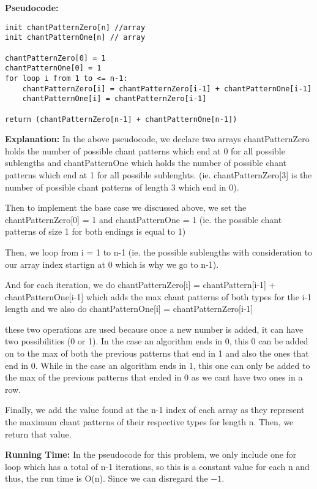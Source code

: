 \documentclass[letterpaper,11pt]{article}
\begin{document}
{\bf Pseudocode:} 
\begin{Verbatim}[commandchars=\\\{\},codes={\catcode`$=3\catcode`_=8}]
init chantPatternZero[n] //array
init chantPatternOne[n] // array

chantPatternZero[0] = 1
chantPatternOne[0] = 1
for loop i from 1 to <= n-1: 
    chantPatternZero[i] = chantPatternZero[i-1] + chantPatternOne[i-1]
    chantPatternOne[i] = chantPatternZero[i-1]

return (chantPatternZero[n-1] + chantPatternOne[n-1])
\end{Verbatim}
{\bf Explanation: } In the above pseudocode, we declare two arrays chantPatternZero holds the number of possible chant patterns which end at 0 for all possible sublengths and chantPatternOne which holds the number of possible chant patterns which end at 1 for all possible sublenghts. (ie. chantPatternZero[3] is the number of possible chant patterns of length 3 which end in 0).

Then to implement the base case we discussed above, we set the 
chantPatternZero[0] = 1 and chantPatternOne = 1 (ie. the possible chant patterns of size 1 for both endings is equal to 1)

Then, we loop from i = 1 to n-1 (ie. the possible sublengths with consideration to our array index startign at 0 which is why we go to n-1). 

And for each iteration, we do 
chantPatternZero[i] = chantPattern[i-1] + chantPatternOne[i-1] which adds the max chant patterns of both types for the i-1 length and we also do 
chantPatternOne[i] = chantPatternZero[i-1]

these two operations are used because once a new number is added, it can have two possibilities (0 or 1). In the case an algorithm ends in 0, this 0 can be added on to the max of both the previous patterns that end in 1 and also the ones that end in 0. While in the case an algorithm ends in 1, this one can only be added to the max of the previous patterns that ended in 0 as we cant have two ones in a row.

Finally, we add the value found at the n-1 index of each array as they represent the maximum chant patterns of their respective types for length n. Then, we return that value. 

{\bf Running Time: } In the pseudocode for this problem, we only include one for loop which has a total of n-1 iterations, so this is a constant value for each n and thus, the run time is O(n). Since we can disregard the $-1$.
\end{document}
